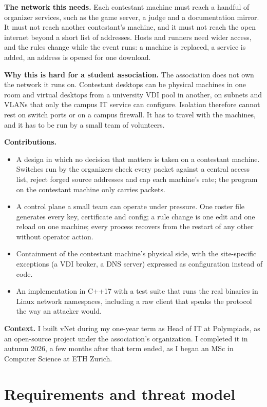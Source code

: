 \documentclass[11pt,a4paper]{article}
\providecommand{\tightlist}{\setlength{\itemsep}{0pt}\setlength{\parskip}{0pt}}
\begin{document}
\textbf{The network this needs.} Each contestant machine must reach a handful of organizer services, such as the game server, a judge and a documentation mirror. It must not reach another contestant's machine, and it must not reach the open internet beyond a short list of addresses. Hosts and runners need wider access, and the rules change while the event runs: a machine is replaced, a service is added, an address is opened for one download.

\textbf{Why this is hard for a student association.} The association does not own the network it runs on. Contestant desktops can be physical machines in one room and virtual desktops from a university VDI pool in another, on subnets and VLANs that only the campus IT service can configure. Isolation therefore cannot rest on switch ports or on a campus firewall. It has to travel with the machines, and it has to be run by a small team of volunteers.

\textbf{Contributions.}

\begin{itemize}
\tightlist
\item
  A design in which no decision that matters is taken on a contestant machine. Switches run by the organizers check every packet against a central access list, reject forged source addresses and cap each machine's rate; the program on the contestant machine only carries packets.
\item
  A control plane a small team can operate under pressure. One roster file generates every key, certificate and config; a rule change is one edit and one reload on one machine; every process recovers from the restart of any other without operator action.
\item
  Containment of the contestant machine's physical side, with the site-specific exceptions (a VDI broker, a DNS server) expressed as configuration instead of code.
\item
  An implementation in C++17 with a test suite that runs the real binaries in Linux network namespaces, including a raw client that speaks the protocol the way an attacker would.
\end{itemize}

\textbf{Context.} I built vNet during my one-year term as Head of IT at Polympiads, as an open-source project under the association's organization. I completed it in autumn 2026, a few months after that term ended, as I began an MSc in Computer Science at ETH Zurich.

\hypertarget{requirements-and-threat-model}{%
\section{Requirements and threat model}\label{requirements-and-threat-model}}
\end{document}
